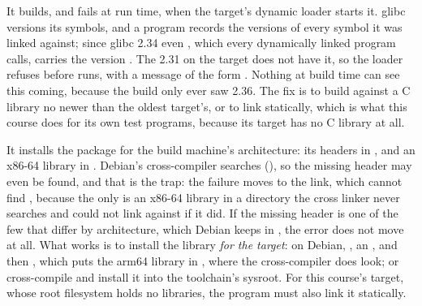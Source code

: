  It builds, and fails at run time, when the target's dynamic loader starts it. glibc
versions its symbols, and a program records the versions of every symbol it was linked against;
since glibc 2.34 even , which every dynamically linked program calls,
carries the version . The 2.31 on the target does not have it, so the loader
refuses before  runs, with a message of the form . Nothing at build time can see this coming, because the build only ever saw
2.36. The fix is to build against a C library no newer than the oldest target's, or to link
statically, which is what this course does for its own test programs, because its target has no C
library at all.

 It installs the package for the build machine's architecture: its headers in
, and an x86-64 library in . Debian's
cross-compiler searches  (), so the missing header may even be
found, and that is the trap: the failure moves to the link, which cannot find , because
the only  is an x86-64 library in a directory the cross linker never searches and could
not link against if it did. If the missing header is one of the few that differ by architecture,
which Debian keeps in , the error does not move at all. What
works is to install the library \emph{for the target}: on Debian, , an , and then , which puts the arm64
library in , where the cross-compiler does look; or cross-compile
 and install it into the toolchain's sysroot. For this course's target, whose root
filesystem holds no libraries, the program must also link it statically.


